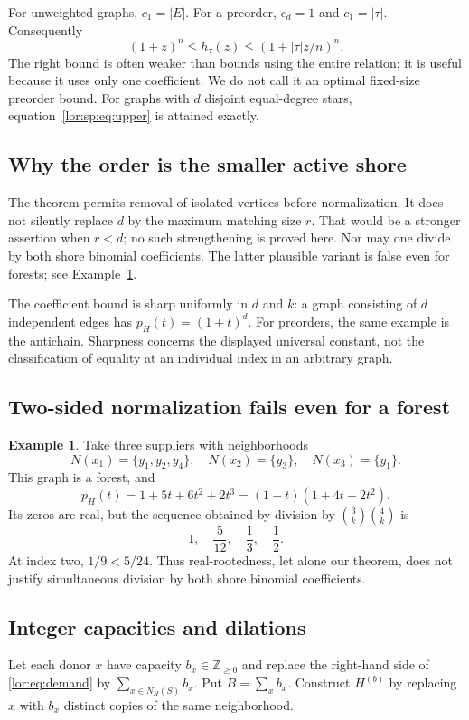 \documentclass[11pt]{article}
\numberwithin{equation}{section}
\theoremstyle{definition}
\newtheorem{example}[theorem]{Example}%
\newcommand{\Z}{\mathbb Z}
\begin{document}
For unweighted graphs, $c_1=|E|$. For a preorder, $c_d=1$ and $c_1=|\tau|$.
Consequently
\[
 (1+z)^n\le h_\tau(z)\le(1+|\tau|z/n)^n.
\]
The right bound is often weaker than bounds using the entire relation; it is
useful because it uses only one coefficient. We do not call it an optimal
fixed-size preorder bound. For graphs with $d$ disjoint equal-degree stars,
equation~\eqref{lor:sp:eq:upper} is attained exactly.

\subsection{Why the order is the smaller active shore}
The theorem permits removal of isolated vertices before normalization. It does
not silently replace $d$ by the maximum matching size $r$. That would be a
stronger assertion when $r<d$; no such strengthening is proved here.
Nor may one divide by both shore binomial coefficients. The latter plausible
variant is false even for forests; see Example~\ref{lor:sp:ex:bad-normalization}.

The coefficient bound is sharp uniformly in $d$ and $k$: a graph consisting
of $d$ independent edges has $p_H(t)=(1+t)^d$. For preorders, the same
example is the antichain. Sharpness concerns the displayed universal constant,
not the classification of equality at an individual index in an arbitrary
graph.

\subsection{Two-sided normalization fails even for a forest}
\begin{example}
\label{lor:sp:ex:bad-normalization}
Take three suppliers with neighborhoods
\[
 N(x_1)=\{y_1,y_2,y_4\},\quad N(x_2)=\{y_3\},\quad N(x_3)=\{y_1\}.
\]
This graph is a forest, and
\[
 p_H(t)=1+5t+6t^2+2t^3=(1+t)(1+4t+2t^2).
\]
Its zeros are real, but the sequence obtained by division by
$\binom3k\binom4k$ is
\[
 1,\quad\frac5{12},\quad\frac13,\quad\frac12.
\]
At index two, $1/9<5/24$. Thus real-rootedness, let alone our theorem, does
not justify simultaneous division by both shore binomial coefficients.
\end{example}

\subsection{Integer capacities and dilations}
Let each donor $x$ have capacity $b_x\in\Z_{\ge0}$ and replace the
right-hand side of \eqref{lor:eq:demand} by
$\sum_{x\in N_H(S)}b_x$. Put $B=\sum_xb_x$. Construct $H^{(b)}$ by replacing
$x$ with $b_x$ distinct copies of the same neighborhood.
\end{document}
